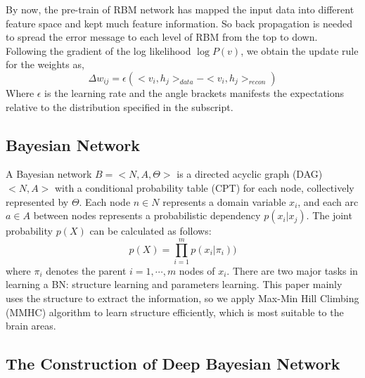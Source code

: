 \documentclass{article}
\begin{document}
By now, the pre-train of RBM network has mapped the input data into different feature space and kept much feature information. So back propagation is needed to spread the error message to each level of RBM from the top to down. Following the gradient of the log likelihood $\log P(v)$, we obtain the update rule for the weights as,
\begin{equation}
\Delta w_{ij} = \epsilon (<v_i,h_j>_{data} - <v_i,h_j>_{recon})
\end{equation}
Where $\epsilon$ is the learning rate and the angle brackets manifests the expectations relative to the distribution specified in the subscript. 


\subsection{Bayesian Network}
A Bayesian network $B=<N,A,\Theta>$ is a directed acyclic graph (DAG) $<N,A>$ with a conditional probability table (CPT) for each node, collectively represented by $\Theta$. Each node $n \in N$ represents a domain variable $x_i$, and each arc $a \in A$ between nodes represents a probabilistic dependency $p(x_i|x_j)$. The joint probability $p(X)$ can be calculated as follows:
\begin{equation}
p(X) =\prod_{i=1}^m p(x_i |\pi_i))
\end{equation}
where $\pi_i$ denotes the parent $i=1,\cdots,m$ nodes of $x_i$.
There are two major tasks in learning a BN: structure learning and parameters learning. This paper mainly uses the structure to extract the information, so we apply  Max-Min Hill Climbing (MMHC) algorithm to learn structure efficiently, which is most suitable to the brain areas.





\subsection{The Construction of Deep Bayesian Network}
\end{document}

